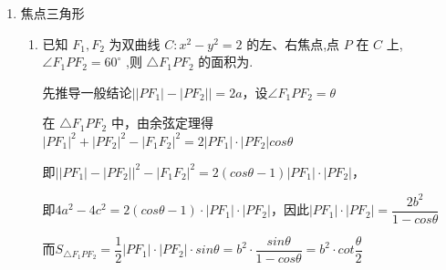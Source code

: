 \begin{enumerate}
    \item 焦点三角形
    \begin{enumerate}
        \item 已知 ${F}_{1},{F}_{2}$ 为双曲线 $C : {x}^{2} - {y}^{2} = 2$ 的左、右焦点,点 $P$ 在 $C$ 上, $\angle {F}_{1}P{F}_{2} = {60}^{ \circ  }$ ,则 $\bigtriangleup  {F}_{1}P{F}_{2}$ 的面积为.
        
        \begin{jieda}
             先推导一般结论$\left|\left| {P{F}_{1}}\right|  - \left| {P{F}_{2}}\right|\right|  = {2a}$，设$\angle{F_1PF_2} = \theta$
            
            在 $\bigtriangleup {F}_{1}P{F}_{2}$ 中，由余弦定理得${\left| P{F}_{1}\right| }^{2} + {\left| P{F}_{2}\right| }^{2} - {\left| {F}_{1}{F}_{2}\right| }^{2} = 2\left| {P{F}_{1}}\right|  \cdot  \left| {P{F}_{2}}\right|cos\theta$
            
            即${\left|\left| P{F}_{1}\right| - \left| P{F}_{2}\right|\right| }^{2} - {\left| {F}_{1}{F}_{2}\right| }^{2} = 2(cos\theta-1)\left| {P{F}_{1}}\right|  \cdot  \left| {P{F}_{2}}\right|$，
            
            即$4a^2 - 4c^2 = 2(cos\theta-1) \cdot \left| {P{F}_{1}}\right|  \cdot  \left| {P{F}_{2}}\right|$，因此$\left| {P{F}_{1}}\right|  \cdot  \left| {P{F}_{2}}\right| = \dfrac{2b^2}{1-cos\theta}$
    
            而${S}_{\bigtriangleup {F}_{1}P{F}_{2}} = \dfrac{1}{2}\left| {P{F}_{1}}\right|  \cdot  \left| {P{F}_{2}}\right|  \cdot  sin \theta = b^2 \cdot \dfrac{sin\theta}{1-cos\theta} = b^2 \cdot cot\dfrac{\theta}{2}$
    

\end{jieda}
\end{enumerate}
\end{enumerate}
